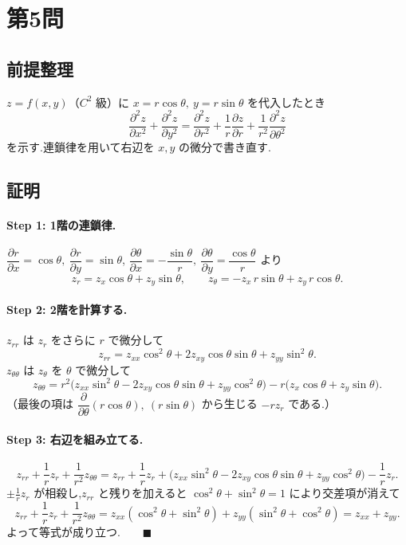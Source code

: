 \documentclass[11pt,a4paper]{article}
\begin{document}
\section*{第5問}

\subsection*{前提整理}

$z=f(x,y)$（$C^2$ 級）に $x=r\cos\theta,\ y=r\sin\theta$ を代入したとき
\[
\frac{\partial^2z}{\partial x^2}+\frac{\partial^2z}{\partial y^2}
=\frac{\partial^2z}{\partial r^2}+\frac1r\frac{\partial z}{\partial r}
+\frac1{r^2}\frac{\partial^2z}{\partial\theta^2}
\]
を示す.連鎖律を用いて右辺を $x,y$ の微分で書き直す.

\subsection*{証明}

\paragraph{Step 1: 1階の連鎖律.}
$\dfrac{\partial r}{\partial x}=\cos\theta,\ \dfrac{\partial r}{\partial y}=\sin\theta$,
$\dfrac{\partial\theta}{\partial x}=-\dfrac{\sin\theta}{r},\ \dfrac{\partial\theta}{\partial y}=\dfrac{\cos\theta}{r}$
より
\[
z_r=z_x\cos\theta+z_y\sin\theta,\qquad
z_\theta=-z_x\,r\sin\theta+z_y\,r\cos\theta.
\]

\paragraph{Step 2: 2階を計算する.}
$z_{rr}$ は $z_r$ をさらに $r$ で微分して
\[
z_{rr}=z_{xx}\cos^2\theta+2z_{xy}\cos\theta\sin\theta+z_{yy}\sin^2\theta.
\]
$z_{\theta\theta}$ は $z_\theta$ を $\theta$ で微分して
\[
z_{\theta\theta}=r^2\bigl(z_{xx}\sin^2\theta-2z_{xy}\cos\theta\sin\theta+z_{yy}\cos^2\theta\bigr)
-r\bigl(z_x\cos\theta+z_y\sin\theta\bigr).
\]
（最後の項は $\dfrac{\partial}{\partial\theta}(r\cos\theta),\ (r\sin\theta)$ から生じる $-rz_r$ である.）

\paragraph{Step 3: 右辺を組み立てる.}
\[
z_{rr}+\frac1r z_r+\frac1{r^2}z_{\theta\theta}
=z_{rr}+\frac1r z_r+\bigl(z_{xx}\sin^2\theta-2z_{xy}\cos\theta\sin\theta+z_{yy}\cos^2\theta\bigr)
-\frac1r z_r.
\]
$\pm\frac1r z_r$ が相殺し,$z_{rr}$ と残りを加えると
$\cos^2\theta+\sin^2\theta=1$ により交差項が消えて
\[
z_{rr}+\frac1r z_r+\frac1{r^2}z_{\theta\theta}
=z_{xx}(\cos^2\theta+\sin^2\theta)+z_{yy}(\sin^2\theta+\cos^2\theta)
=z_{xx}+z_{yy}.
\]
よって等式が成り立つ.$\qquad\blacksquare$
\end{document}
